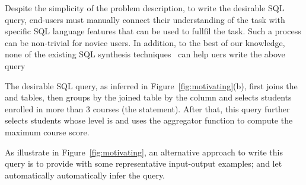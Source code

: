 Despite the simplicity of the problem description,
to write the desirable SQL query, end-users must manually
connect their understanding of the task
with specific SQL language features that can be used to
fullfil the task. Such a process can be non-trivial
for novice users.  In addition, to the best of our knowledge,
none of the existing SQL synthesis techniques~\cite{Zloof:1975,
Tran:2009, DasSarma:2010, abs-1208-2013}
can help uers write the above query

The desirable SQL query, as \ourtool inferred in
Figure~\ref{fig:motivating}(b), first joins the
 and  tables,
then groups by the joined table by the 
column and selects students enrolled in more
than 3 courses (the  statement).
After that, this query further selects students
whose level is  and uses the 
aggregator function to compute the maximum course score.



As illustrate in Figure~\ref{fig:motivating}, an alternative
approach to write this query is to provide \ourtool
with some representative input-output examples; and
let \ourtool automatically automatically infer the query.


